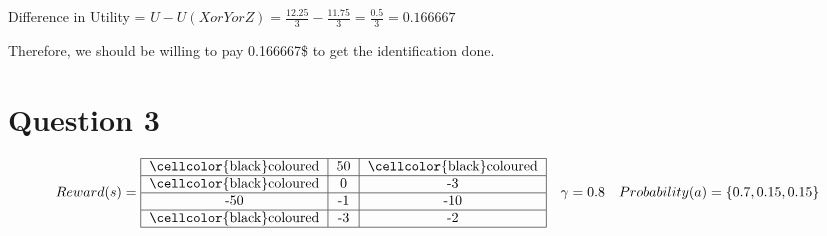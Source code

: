 \documentclass[letter, 10pt]{article}
\begin{document}
Difference in Utility = $U-U(X or Y or Z) = \frac{12.25}{3}-\frac{11.75}{3} = \frac{0.5}{3} = 0.166667$

Therefore, we should be willing to pay 0.166667\$ to get the identification done.

\section*{Question 3}
\begin{equation*}
    Reward(s) = \begin{tabular}{ |c|c|c| } 
                \hline
                \cellcolor{black}coloured & 50 & \cellcolor{black}coloured\\
                \hline
                \cellcolor{black}coloured & 0 & -3\\
                \hline
                -50 & -1 & -10\\
                \hline
                \cellcolor{black}coloured & -3 & -2\\
                \hline
                \end{tabular}\quad
    \gamma = 0.8\quad
    Probability(a) = \{0.7, 0.15, 0.15\}
\end{equation*}
\end{document}
